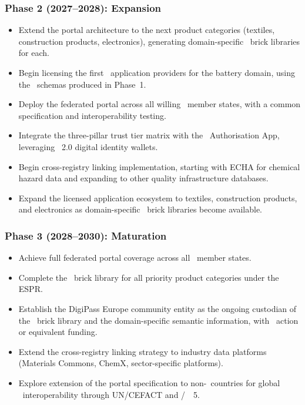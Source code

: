 \subsubsection{Phase 2 (2027--2028): Expansion}

\begin{itemize}
\item Extend the portal architecture to the next product categories (textiles,
construction products, electronics), generating domain-specific \SHACL\ brick
libraries for each.
\item Begin licensing the first \DPP\ application providers for the battery
domain, using the \SHACL\ schemas produced in Phase~1.
\item Deploy the federated portal across all willing \EU\ member states, with a
common specification and interoperability testing.
\item Integrate the three-pillar trust tier matrix with the \EC\ Authorisation
App, leveraging \eIDAS~2.0 digital identity wallets.
\item Begin cross-registry linking implementation, starting with ECHA for
chemical hazard data and expanding to other quality infrastructure databases.
\item Expand the licensed application ecosystem to textiles, construction
products, and electronics as domain-specific \SHACL\ brick libraries become
available.
\end{itemize}

\subsubsection{Phase 3 (2028--2030): Maturation}

\begin{itemize}
\item Achieve full federated portal coverage across all \EU\ member states.
\item Complete the \SHACL\ brick library for all priority product categories
under the ESPR.
\item Establish the DigiPass Europe community entity as the ongoing custodian of
the \SHACL\ brick library and the domain-specific semantic information, with
\COST\ action or equivalent funding.
\item Extend the cross-registry linking strategy to industry data platforms
(Materials Commons, ChemX, sector-specific platforms).
\item Explore extension of the portal specification to non-\EU\ countries for
global \DPP\ interoperability through UN/CEFACT and \ISO/\IEC\ \JTC~5.
\end{itemize}

